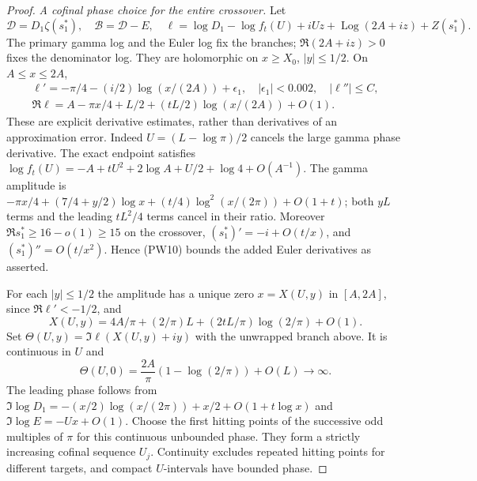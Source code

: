 \documentclass[11pt]{article}
\theoremstyle{remark}\newtheorem{remark}[theorem]{Remark}
\begin{document}
\begin{proof}
\emph{A cofinal phase choice for the entire crossover.}
Let
\[
 \mathcal D=D_1\zeta(s_1^*),\quad
 \mathcal B=\mathcal D-E,\quad
 \ell=\log D_1-\log f_t(U)+iUz+\operatorname{Log}(2A+iz)+Z(s_1^*).
                                                            \tag{PW14}
\]
The primary gamma log and the Euler log fix the branches;
$\Re(2A+iz)>0$ fixes the denominator log. They are holomorphic on
$x\ge X_0$, $|y|\le1/2$. On $A\le x\le2A$,
\[
 \begin{gathered}
 \ell'=-\pi/4-(i/2)\log(x/(2A))+\epsilon_1,
                    \quad|\epsilon_1|<0.002,\quad |\ell''|\le C,\\
 \Re\ell=A-\pi x/4+L/2+(tL/2)\log(x/(2A))+O(1).
 \end{gathered}                                      \tag{PW15}
\]
These are explicit derivative estimates, rather than derivatives of
an approximation error. Indeed $U=(L-\log\pi)/2$ cancels the large
gamma phase derivative. The exact endpoint satisfies
$\log f_t(U)=-A+tU^2+2\log A+U/2+\log4+O(A^{-1})$.
The gamma amplitude is
$-\pi x/4+(7/4+y/2)\log x+(t/4)\log^2(x/(2\pi))+O(1+t)$;
both $yL$ terms and the leading $tL^2/4$ terms cancel in their ratio.
Moreover $\Re s_1^*\ge16-o(1)\ge15$ on the crossover,
$(s_1^*)'=-i+O(t/x)$, and $(s_1^*)''=O(t/x^2)$.
Hence (PW10) bounds the added Euler derivatives as asserted.

For each $|y|\le1/2$ the amplitude has a unique zero
$x=X(U,y)$ in $[A,2A]$, since $\Re\ell'<-1/2$, and
\[
 X(U,y)=4A/\pi+(2/\pi)L
                +(2tL/\pi)\log(2/\pi)+O(1).       \tag{PW16}
\]
Set $\Theta(U,y)=\Im\ell(X(U,y)+iy)$ with the unwrapped branch
above. It is continuous in $U$ and
\[
 \Theta(U,0)=\frac{2A}{\pi}(1-\log(2/\pi))+O(L)\longrightarrow\infty.
                                                            \tag{PW17}
\]
The leading phase follows from
$\Im\log D_1=-(x/2)\log(x/(2\pi))+x/2+O(1+t\log x)$
and $\Im\log E=-Ux+O(1)$. Choose the first hitting points of the
successive odd multiples of $\pi$ for this continuous unbounded
phase. They form a strictly increasing cofinal sequence $U_j$.
Continuity excludes repeated hitting points for different targets,
and compact $U$-intervals have bounded phase.


\end{proof}
\end{document}
